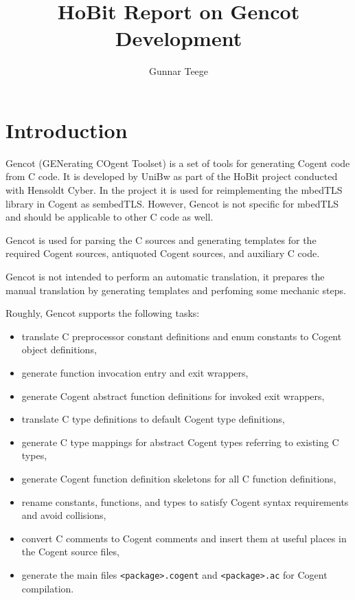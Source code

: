 \documentclass[a4paper]{report}
\newcommand{\code}[1]{\textnormal{\texttt{#1}}}
\begin{document}
\title{HoBit Report on Gencot Development}
\author{Gunnar Teege}

\maketitle

\chapter{Introduction}

Gencot (GENerating COgent Toolset) is a set of tools for generating Cogent code from C code. It is developed by UniBw 
as part of the HoBit project conducted with Hensoldt Cyber. In the project it is used for reimplementing
the mbedTLS library in Cogent as sembedTLS. However, Gencot is not specific for mbedTLS and should be applicable
to other C code as well.

Gencot is used for parsing the C sources and generating templates for the required Cogent sources, 
antiquoted Cogent sources, and auxiliary C code. 

Gencot is not intended to perform an automatic translation, it prepares the manual translation by 
generating templates and perfoming some mechanic steps.

Roughly, Gencot supports the following tasks:
\begin{itemize}
\item translate C preprocessor constant definitions and enum constants to Cogent object definitions,
\item generate function invocation entry and exit wrappers,
\item generate Cogent abstract function definitions for invoked exit wrappers,
\item translate C type definitions to default Cogent type definitions,
\item generate C type mappings for abstract Cogent types referring to existing C types,
\item generate Cogent function definition skeletons for all C function definitions,
\item rename constants, functions, and types to satisfy Cogent syntax requirements and avoid collisions,
\item convert C comments to Cogent comments and insert them at useful places in the Cogent source files,
\item generate the main files \code{<package>.cogent} and \code{<package>.ac} for Cogent compilation.
\end{itemize}
\end{document}
